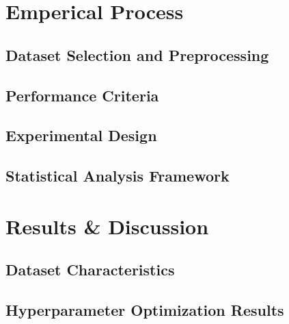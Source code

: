 \documentclass[10pt, conference]{IEEEtran}
\begin{document}
\section{Emperical Process}
\subsection{Dataset Selection and Preprocessing}

\subsection{Performance Criteria}

\subsection{Experimental Design}

\subsection{Statistical Analysis Framework}

\section{Results \& Discussion}
\subsection{Dataset Characteristics}

\subsection{Hyperparameter Optimization Results}
\end{document}
